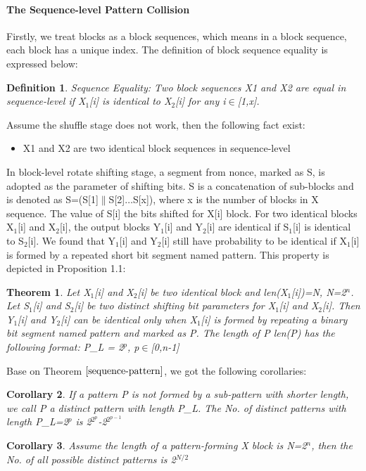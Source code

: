 \documentclass{article}
\newtheorem{theorem}{Theorem}[section]
\newtheorem{corollary}[theorem]{Corollary}
\newtheorem{defination}{Definition}[section]
\begin{document}
\paragraph{}
\paragraph{The Sequence-level Pattern Collision}
Firstly, we treat blocks as a block sequences, which means in a block sequence, each block has a unique index. The definition of block sequence equality is expressed below:
\begin{defination}
Sequence Equality: Two block sequences X1 and X2 are equal in sequence-level if X$_1$[i] is identical to X$_2$[i] for any i$\in$[1,x].
\end{defination}

Assume the shuffle stage does not work, then the following fact exist:
\begin{itemize}
	\item X1 and X2 are two identical block sequences in sequence-level
\end{itemize}

In block-level rotate shifting stage, a segment from nonce, marked as S, is adopted as the parameter of shifting bits. S is a concatenation of sub-blocks and is denoted as S=(S[1]$\|$S[2]$\ldots$S[x]), where x is the number of blocks in X sequence. The value of S[i] the bits shifted for X[i] block.
For two identical blocks X$_1$[i] and X$_2$[i], the output blocks Y$_1$[i] and Y$_2$[i] are identical if S$_1$[i] is identical to S$_2$[i]. We found that Y$_1$[i] and Y$_2$[i] still have probability to be identical if X$_1$[i] is formed by a repeated short bit segment named pattern. This property is depicted in Proposition 1.1:
\begin{theorem}
Let X$_1$[i] and X$_2$[i] be two identical block and len(X$_1$[i])=N, N=2$^n$. Let S$_1$[i] and S$_2$[i] be two distinct shifting bit parameters for X$_1$[i] and X$_2$[i].
Then Y$_1$[i] and Y$_2$[i] can be identical only when X$_1$[i] is formed by repeating a binary bit segment named pattern and marked as P. The length of P len(P) has the following format:
	P\_L = 2$^p$, p$\in$[0,n-1]
\label{sequence-pattern}
\end{theorem}
Base on Theorem $\ref{sequence-pattern}$, we got the following corollaries:
\begin{corollary}
If a pattern P is not formed by a sub-pattern with shorter length, we call P a distinct pattern with length P\_L. The No. of distinct patterns with length P\_L=2$^p$ is 2$^{2^p}$-2$^{2^{p-1}}$
\label{distinct-pattern}
\end{corollary}
\begin{corollary}
Assume the length of a pattern-forming X block is N=2$^n$, then the No. of all possible distinct patterns is 2$^{N/2}$
\label{pattern-no}
\end{corollary}
\end{document}
